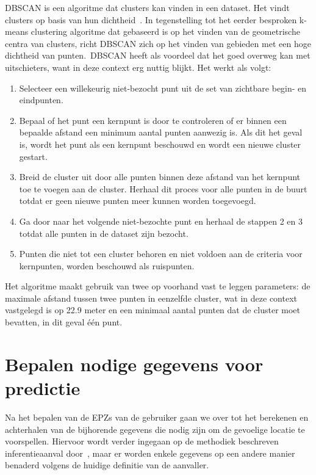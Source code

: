 \ac{DBSCAN} is een algoritme dat clusters kan vinden in een dataset. Het vindt
clusters op basis van hun dichtheid~\cite{KMeansvs80:online}. In tegenstelling tot het eerder besproken
k-means clustering algoritme dat gebaseerd is
op het vinden van de geometrische centra van clusters, richt \ac{DBSCAN}
zich op het vinden van gebieden met een hoge dichtheid van punten.\ \ac{DBSCAN}
heeft als voordeel dat het goed overweg kan met uitschieters, want in deze
context erg nuttig blijkt. Het werkt als volgt:
\begin{enumerate}
    \item Selecteer een willekeurig niet-bezocht punt uit de set van zichtbare begin- en
          eindpunten.
    \item Bepaal of het punt een kernpunt is door te controleren of er binnen een
          bepaalde afstand een minimum aantal punten aanwezig is. Als dit het geval is,
          wordt het punt als een kernpunt beschouwd en wordt een nieuwe cluster gestart.
    \item Breid de cluster uit door alle punten binnen deze afstand van het kernpunt toe
          te voegen aan de cluster. Herhaal dit proces voor alle punten in de buurt
          totdat er geen nieuwe punten meer kunnen worden toegevoegd.
    \item Ga door naar het volgende niet-bezochte punt en herhaal de stappen 2 en 3
          totdat alle punten in de dataset zijn bezocht.
    \item Punten die niet tot een cluster behoren en niet voldoen aan de criteria voor
          kernpunten, worden beschouwd als ruispunten.
\end{enumerate}
Het algoritme maakt gebruik van twee op voorhand vast te leggen parameters: de maximale afstand tussen twee
punten in eenzelfde cluster, wat in deze context vastgelegd is op 22.9 meter en
een minimaal aantal punten dat de cluster moet bevatten, in dit geval één punt.

\section{Bepalen nodige gegevens voor predictie}
Na het bepalen van de \acp{EPZ} van de gebruiker gaan we over tot het berekenen
en achterhalen van de bijhorende gegevens die nodig zijn om de gevoelige
locatie te voorspellen. Hiervoor wordt verder ingegaan op de methodiek
beschreven inferentieaanval door~\citeauthor{Dhondt}, maar er worden enkele
gegevens op een andere manier benaderd volgens de huidige definitie van de
aanvaller.

